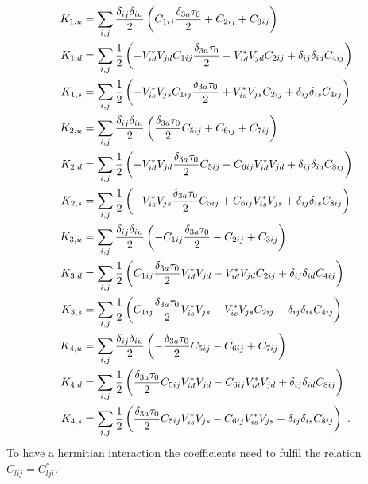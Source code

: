 \begin{align}\label{eq:CoeffNormal}
	K_{1,u} &= \sum_{i,j}\frac{\delta_{ij}\delta_{iu}}{2}\left(C_{1ij}\frac{\delta_{3a}\tau_{0}}{2}+ 
	C_{2ij} + C_{3ij}\right)\notag \\
	K_{1,d} &= \sum_{i,j}\frac{1}{2}\left(-V_{id}^*V_{jd}C_{1ij}\frac{\delta_{3a}\tau_{0}}{2}+ V_{id}^*V_{jd}C_{2ij} + \delta_{ij}\delta_{id}C_{4ij}\right)\notag \\
	K_{1,s} &= \sum_{i,j}\frac{1}{2}\left(- V_{is}^*V_{js}C_{1ij}\frac{\delta_{3a}\tau_{0}}{2}+ V_{is}^*V_{js}C_{2ij}+ \delta_{ij}\delta_{is}C_{4ij}\right)\notag \\
	K_{2,u} &= \sum_{i,j}\frac{\delta_{ij}\delta_{iu}}{2}\left(\frac{\delta_{3a}\tau_{0}}{2}C_{5ij}+ 
	C_{6ij} + C_{7ij}\right)\notag \\
	K_{2,d} &= \sum_{i,j}\frac{1}{2}\left(- V_{id}^*V_{jd}\frac{\delta_{3a}\tau_{0}}{2}C_{5ij} + C_{6ij}V_{id}^*V_{jd} + \delta_{ij}\delta_{id}C_{8ij}\right)\notag \\
	K_{2,s} &= \sum_{i,j}\frac{1}{2}\left(- V_{is}^*V_{js}\frac{\delta_{3a}\tau_{0}}{2}C_{5ij} + C_{6ij}V_{is}^*V_{js} + \delta_{ij}\delta_{is}C_{8ij}\right)\notag \\
	K_{3,u} &= \sum_{i,j}\frac{\delta_{ij}\delta_{iu}}{2}\left(- C_{1ij}\frac{\delta_{3a}\tau_{0}}{2} - C_{2ij} + C_{3ij}\right)\notag \\
	K_{3,d} &= \sum_{i,j}\frac{1}{2}\left(C_{1ij}\frac{\delta_{3a}\tau_{0}}{2} V_{id}^*V_{jd} - V_{id}^*V_{jd}C_{2ij} + \delta_{ij}\delta_{id}C_{4ij}\right)\notag \\
	K_{3,s} &= \sum_{i,j}\frac{1}{2}\left(C_{1ij}\frac{\delta_{3a}\tau_{0}}{2} V_{is}^*V_{js} - V_{is}^*V_{js}C_{2ij} + \delta_{ij}\delta_{is}C_{4ij}\right)\notag \\
	K_{4,u} &= \sum_{i,j}\frac{\delta_{ij}\delta_{iu}}{2}\left(-\frac{\delta_{3a}\tau_{0}}{2}C_{5ij} - C_{6ij} + C_{7ij}\right)\notag \\
	K_{4,d} &= \sum_{i,j}\frac{1}{2}\left(\frac{\delta_{3a}\tau_{0}}{2}C_{5ij}V_{id}^*V_{jd} - C_{6ij}V_{id}^*V_{jd} + \delta_{ij}\delta_{id}C_{8ij}\right)\notag \\
	K_{4,s} &= \sum_{i,j}\frac{1}{2}\left(\frac{\delta_{3a}\tau_{0}}{2}C_{5ij}V_{is}^*V_{js} - C_{6ij}V_{is}^*V_{js} + \delta_{ij}\delta_{is}C_{8ij}\right) \ .
\end{align}
To have a hermitian interaction the coefficients need to fulfil the relation $C_{lij} = C_{lji}^*$.